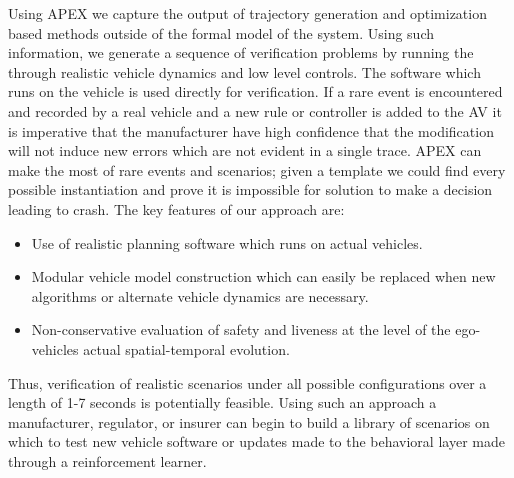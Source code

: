  Using APEX we capture the output of trajectory generation and optimization based methods outside of the formal model of the system. Using such information, we generate a sequence of verification problems by running the through realistic vehicle dynamics and low level controls. The software which runs on the vehicle is used directly for verification. If a rare event is encountered and recorded by a real vehicle and a new rule or controller is added to the AV it is imperative that the manufacturer have high confidence that the modification will not induce new errors which are not evident in a single trace. APEX can make the most of rare events and scenarios; given a template we could find every possible instantiation and prove it is impossible for solution to make a decision leading to crash. The key features of our approach are:
 \begin{itemize}
 	\item Use of realistic planning software which runs on actual vehicles.
 	\item Modular vehicle model construction which can easily be replaced when new algorithms or alternate vehicle dynamics are necessary.
 	\item Non-conservative evaluation of safety and liveness at the level of the ego-vehicles actual spatial-temporal evolution. 
 \end{itemize}
 
 Thus, verification of realistic scenarios under all possible configurations over a length of 1-7 seconds is potentially feasible. Using such an approach a manufacturer, regulator, or insurer can begin to build a library of scenarios on which to test new vehicle software or updates made to the behavioral layer made through a reinforcement learner.
 
